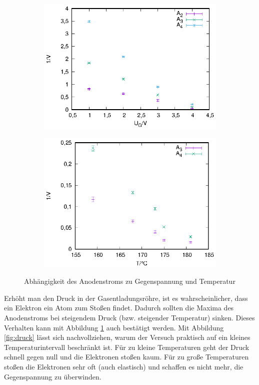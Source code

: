 \begin{figure}[h]
  \centering
  \begin{subfigure}[h]{0.5\textwidth}
    \centering
    \includegraphics{data/fh/abh_u.eps}
  \end{subfigure}%
  \begin{subfigure}[h]{0.5\textwidth}
    \centering
    \includegraphics{data/fh/abh_t.eps}
  \end{subfigure}
  \caption{Abhängigkeit des Anodenstroms zu Gegenspannung und Temperatur}
  \label{fig:abh}
\end{figure}

Erhöht man den Druck in der Gasentladungsröhre, ist es wahrscheinlicher, dass ein Elektron ein Atom zum Stoßen findet. Dadurch sollten die Maxima des Anodenstroms bei steigendem Druck (bzw. steigender Temperatur) sinken. Dieses Verhalten kann mit Abbildung \ref{fig:abh} auch bestätigt werden. Mit Abbildung \ref{fig:druck} lässt sich nachvollziehen, warum der Versuch praktisch auf ein kleines Temperaturintervall beschränkt ist. Für zu kleine Temperaturen geht der Druck schnell gegen null und die Elektronen stoßen kaum. Für zu große Temperaturen stoßen die Elektronen sehr oft (auch elastisch) und schaffen es nicht mehr, die Gegenspannung zu überwinden.

